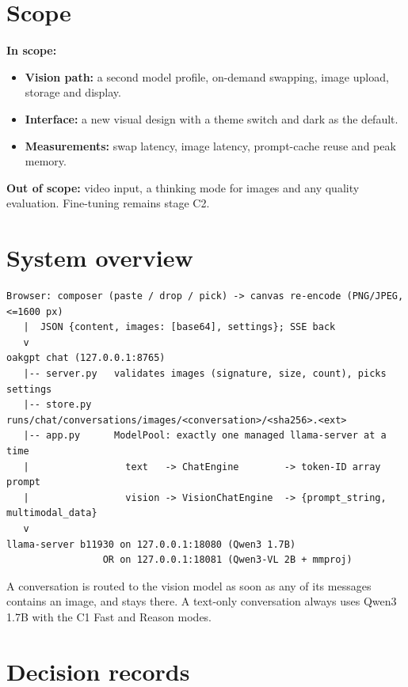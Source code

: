 \documentclass[11pt,a4paper]{article}
\begin{document}
\tableofcontents

\section{Scope}

\textbf{In scope:}
\begin{itemize}
  \item \textbf{Vision path:} a second model profile, on-demand swapping, image upload,
        storage and display.
  \item \textbf{Interface:} a new visual design with a theme switch and dark as the
        default.
  \item \textbf{Measurements:} swap latency, image latency, prompt-cache reuse and peak
        memory.
\end{itemize}
\textbf{Out of scope:} video input, a thinking mode for images and any quality
evaluation. Fine-tuning remains stage C2.

\section{System overview}

\begin{Verbatim}[fontsize=\footnotesize,frame=single,framesep=3mm]
Browser: composer (paste / drop / pick) -> canvas re-encode (PNG/JPEG, <=1600 px)
   |  JSON {content, images: [base64], settings}; SSE back
   v
oakgpt chat (127.0.0.1:8765)
   |-- server.py   validates images (signature, size, count), picks settings
   |-- store.py    runs/chat/conversations/images/<conversation>/<sha256>.<ext>
   |-- app.py      ModelPool: exactly one managed llama-server at a time
   |                 text   -> ChatEngine        -> token-ID array prompt
   |                 vision -> VisionChatEngine  -> {prompt_string, multimodal_data}
   v
llama-server b11930 on 127.0.0.1:18080 (Qwen3 1.7B)
                 OR on 127.0.0.1:18081 (Qwen3-VL 2B + mmproj)
\end{Verbatim}

A conversation is routed to the vision model as soon as any of its messages contains an
image, and stays there. A text-only conversation always uses Qwen3 1.7B with the C1 Fast
and Reason modes.

\section{Decision records}
\end{document}
